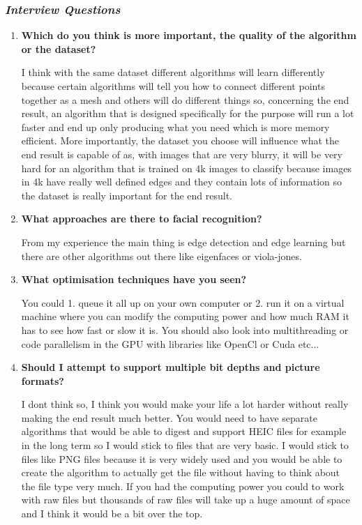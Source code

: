 \subsubsection{\textit{Interview Questions}}
\vspace{5px}
\begin{enumerate}
    \item \textbf{Which do you think is more important, the quality of the algorithm or the dataset?}
    \par
    I think with the same dataset different algorithms will learn differently because certain algorithms will tell you how to connect different points together as a mesh and others will do different things so, concerning the end result, an algorithm that is designed specifically for the purpose will run a lot faster and end up only producing what you need which is more memory efficient. More importantly, the dataset you choose will influence what the end result is capable of as, with images that are very blurry, it will be very hard for an algorithm that is trained on 4k images to classify because images in 4k have really well defined edges and they contain lots of information so the dataset is really important for the end result.
    \item \textbf{What approaches are there to facial recognition?}
    \par
    From my experience the main thing is edge detection and edge learning but there are other algorithms out there like eigenfaces or viola-jones.
    \item \textbf{What optimisation techniques have you seen?}
    \par
    You could 1. queue it all up on your own computer or 2. run it on a virtual machine where you can modify the computing power and how much RAM it has to see how fast or slow it is. You should also look into multithreading or code parallelism in the GPU with libraries like OpenCl or Cuda etc...
    \item \textbf{Should I attempt to support multiple bit depths and picture formats?}
    \par
    I dont think so, I think you would make your life a lot harder without really making the end result much better. You would need to have separate algorithms that would be able to digest and support HEIC files for example in the long term so I would stick to files that are very basic. I would stick to files like PNG files because it is very widely used and you would be able to create the algorithm to actually get the file without having to think about the file type very much. If you had the computing power you could to work with raw files but thousands of raw files will take up a huge amount of space and I think it would be a bit over the top.

\end{enumerate}
